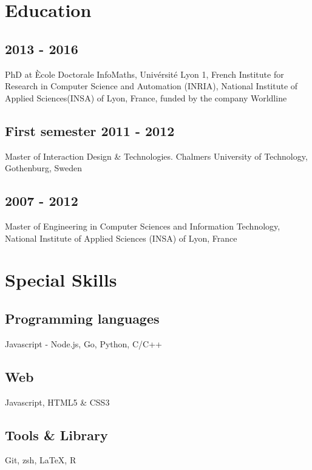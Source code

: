 
\section{Education}
	\subsection{2013 - 2016}
		{PhD at Ècole Doctorale InfoMaths, Univérsité Lyon 1, French Institute for Research in Computer Science and Automation (INRIA), National Institute of Applied Sciences(INSA) of Lyon, France, funded by the company Worldline}

  \subsection{First semester 2011 - 2012}
  	{Master of Interaction Design \& Technologies. Chalmers University of Technology, Gothenburg, Sweden}

	\subsection{2007 - 2012}
		{Master of Engineering in Computer Sciences and Information Technology, National Institute of Applied Sciences (INSA) of Lyon, France}

\eject

\section{Special Skills}
	\subsection{Programming languages}
		{Javascript - Node.js, Go, Python, C/C++}

	\subsection{Web}
		{Javascript, HTML5 \& CSS3}

	\subsection{Tools \& Library}
	  {Git, zsh, \LaTeX, R}

